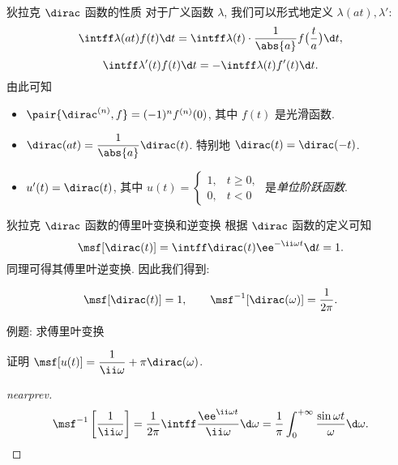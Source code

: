 \begin{frame}{狄拉克 $\dirac$ 函数的性质\noexer}
	\onslide<+->
	对于广义函数 $\lambda$, 我们可以形式地定义 $\lambda(at),\lambda'$:
	\[
		\intff \lambda(at)f(t)\d t
	=\intff \lambda(t)\cdot\frac1{\abs{a}}f\bigl(\frac ta\bigr)\d t,
	\]
	\[
		\intff \lambda'(t)f(t)\d t
	=-\intff \lambda(t)f'(t)\d t.
	\]
	\onslide<+->
	由此可知
	\begin{itemize}
		\item $\pair{\dirac^{(n)},f}=(-1)^nf^{(n)}(0)$, 其中 $f(t)$ 是光滑函数.
		\item $\dirac(at)=\dfrac1{\abs{a}}\dirac(t)$. 特别地 $\dirac(t)=\dirac(-t)$.
		\item $u'(t)=\dirac(t)$, 其中 $u(t)=\begin{cases}1,&t\ge0,\\0,&t<0\end{cases}$ 是\emph{单位阶跃函数}.
	\end{itemize}
\end{frame}


\begin{frame}{狄拉克 $\dirac$ 函数的傅里叶变换和逆变换}
	\onslide<+->
	根据 $\dirac$ 函数的定义可知
	\[
		\msf[\dirac(t)]=\intff \dirac(t)\ee^{-\ii \omega t}\d t=1.
	\]
	\onslide<+->
	同理可得其傅里叶逆变换.
	\onslide<+->
	因此我们得到:
	\begin{theorem*}[][]%
	\[
		\msf[\dirac(t)]=1,\qquad
		\msf^{-1}[\dirac(\omega)]=\dfrac1{2\pi}.
	\]
	\end{theorem*}
\end{frame}


\begin{frame}{例题: 求傅里叶变换}
	\onslide<+->
	\begin{example}[nearnext]
		证明 \alert{$\msf[u(t)]=\dfrac1{\ii \omega}+\pi\dirac(\omega)$}.
	\end{example}
	\onslide<+->
	\begin{proof}[nearprev]
		\[
			\msf^{-1}\left[\frac1{\ii \omega}\right]
				=\frac1{2\pi}\intff \frac{\ee^{\ii \omega t}}{\ii \omega} \d\omega
				=\frac1\pi\int_0^{+\infty}\frac{\sin\omega t}{\omega} \d\omega.
		\]
		\onslide<+->{%
			故
			\[
				\msf^{-1} \left[\frac1{\ii \omega}+\pi\dirac(\omega)\right]
				=\half\sgn(t)+\half =u(t)\quad (t\neq 0).\qedhere
			\]
		}
	\end{proof}
\end{frame}


